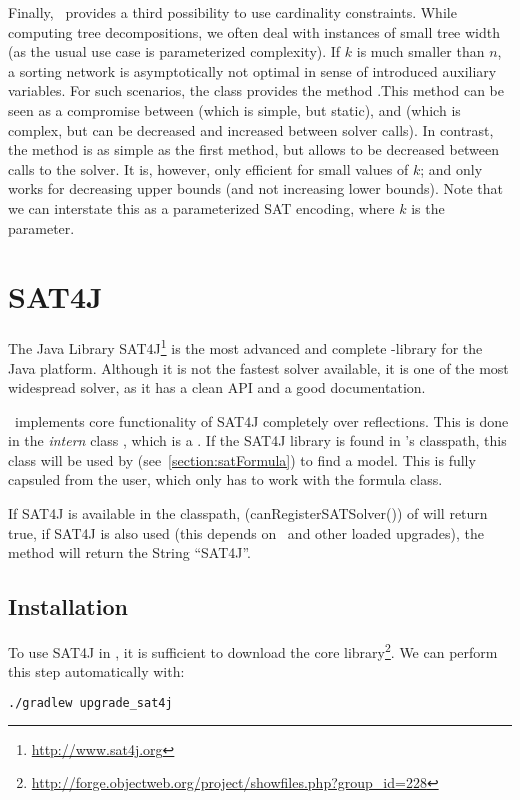 \documentclass[a4paper, ukenglish, twoside, openright]{jdrasilmanual}
\begin{document}
Finally, \Jdrasil\ provides a third possibility to use cardinality
constraints. While computing tree decompositions, we often deal with
instances of small tree width (as the usual use case is
parameterized complexity). If $k$ is much smaller than $n$, a sorting
network is asymptotically not optimal in sense of introduced auxiliary
variables. For such scenarios, the  class provides the
method .This method can be seen as a compromise between
 (which is simple, but static), and
 (which is complex, but can be
decreased and increased between solver calls). In contrast, the method
 is as simple as the first method, but
allows to be decreased between calls to the solver. It is, however,
only efficient for small values of $k$; and only works for decreasing
upper bounds (and not increasing lower bounds). Note that we can
interstate this as a parameterized SAT encoding, where $k$ is the
parameter.

\section{SAT4J}
The Java Library SAT4J\footnote{\url{http://www.sat4j.org}} is the
most advanced and complete -library for the Java
platform. Although it is not the fastest solver available, it is one
of the most widespread solver, as it has a clean API and a good
documentation.

\Jdrasil\ implements core functionality of SAT4J completely over
reflections. This is done in the \emph{intern} class
, which is a
. If the SAT4J library is found in
\Jdrasil's classpath, this class will be used by
 (see~\ref{section:satFormula}) to find a
model. This is fully capsuled from the user, which only has to work
with the formula class. 

If SAT4J is available in the classpath,
\JMethod(canRegisterSATSolver()) of  will
return true, if SAT4J is also used (this depends on \Jdrasil\ and other
loaded upgrades), the method  will return the String
``SAT4J''. 

\subsection{Installation}
To use SAT4J in \Jdrasil, it is sufficient to download the core
library\footnote{\url{http://forge.objectweb.org/project/showfiles.php?group_id=228}}.
We can perform this step automatically with:
\begin{lstlisting}[language=bash]
  ./gradlew upgrade_sat4j
\end{lstlisting}
\end{document}
